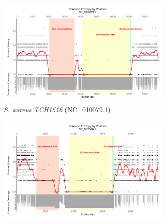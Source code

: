 \documentclass[10pt]{article}
\begin{document}
\begin{figure}
  \centering
  \ContinuedFloat
  \begin{subfigure}[b]{.45\textwidth}
    \includegraphics[width=0.95\textwidth]{gage_entropy_figures/NC_010079.1_entropy_plot}
    \caption{\textit{S. aureus TCH1516} (NC\_010079.1)}
    \label{fig:ent_tch}
  \end{subfigure}
  \begin{subfigure}[b]{.45\textwidth}
    \includegraphics[width=0.95\textwidth]{gage_entropy_figures/NC_002506.1_entropy_plot}

\end{subfigure}
\end{figure}
\end{document}
